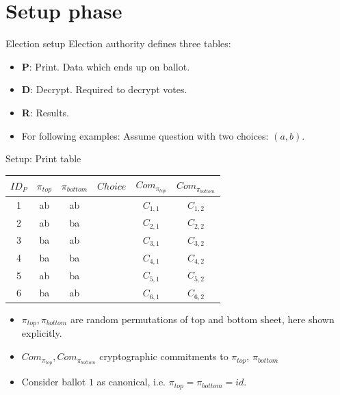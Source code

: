 \documentclass{beamer}
\begin{document}
\section{Setup phase}

\begin{frame}{Election setup}
	Election authority defines three tables:
	\begin{itemize}
		\item \textbf{P}: Print. Data which ends up on ballot.
		\item \textbf{D}: Decrypt. Required to decrypt votes.
		\item \textbf{R}: Results.
		\item For following examples: Assume question with two choices:
			$(a, b)$.
	\end{itemize}
\end{frame}

\begin{frame}{Setup: Print table}
	\begin{center}
		\begin{tabular}{|c|c|c|c|c|c|}
			\hline
			$ID_P$ & $\pi_{top}$ & $\pi_{bottom}$ & $Choice$ & $Com_{\pi_{top}}$ & $Com_{\pi_{bottom}}$ \\
			\hline
			1 & ab & ab & & $C_{1, 1}$ & $C_{1, 2}$ \\
			2 & ab & ba & & $C_{2, 1}$ & $C_{2, 2}$ \\
			3 & ba & ab & & $C_{3, 1}$ & $C_{3, 2}$ \\
			4 & ba & ba & & $C_{4, 1}$ & $C_{4, 2}$ \\
			5 & ab & ba & & $C_{5, 1}$ & $C_{5, 2}$ \\
			6 & ba & ab & & $C_{6, 1}$ & $C_{6, 2}$ \\
			\hline
		\end{tabular}
	\end{center}

	\begin{itemize}
		\item $\pi_{top}, \pi_{bottom}$ are random permutations of top and bottom
			sheet, here shown explicitly.
		\item $Com_{\pi_{top}}, Com_{\pi_{bottom}}$ cryptographic commitments to
			$\pi_{top}$, $\pi_{bottom}$
		\item Consider ballot $1$ as canonical, i.e.
			$\pi_{top} = \pi_{bottom} = id$.
	\end{itemize}
\end{frame}
\end{document}
